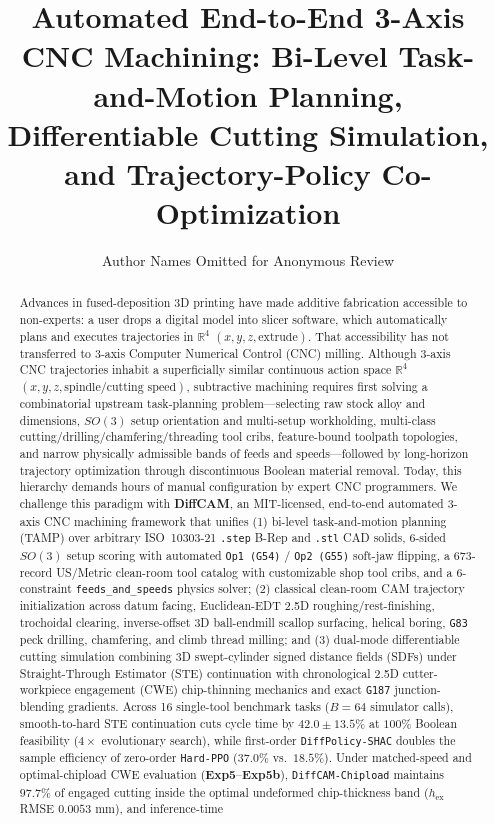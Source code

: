 \documentclass[conference]{IEEEtran}
\begin{document}
\title{Automated End-to-End 3-Axis CNC Machining: Bi-Level Task-and-Motion Planning, Differentiable Cutting Simulation, and Trajectory-Policy Co-Optimization}

\author{Author Names Omitted for Anonymous Review}

\maketitle

\begin{abstract}
Advances in fused-deposition 3D printing have made additive fabrication accessible to non-experts: a user drops a digital model into slicer software, which automatically plans and executes trajectories in $\mathbb{R}^4$ $(x, y, z, \text{extrude})$. That accessibility has not transferred to 3-axis Computer Numerical Control (CNC) milling. Although 3-axis CNC trajectories inhabit a superficially similar continuous action space $\mathbb{R}^4$ $(x, y, z, \text{spindle/cutting speed})$, subtractive machining requires first solving a combinatorial upstream task-planning problem—selecting raw stock alloy and dimensions, $SO(3)$ setup orientation and multi-setup workholding, multi-class cutting/drilling/chamfering/threading tool cribs, feature-bound toolpath topologies, and narrow physically admissible bands of feeds and speeds—followed by long-horizon trajectory optimization through discontinuous Boolean material removal. Today, this hierarchy demands hours of manual configuration by expert CNC programmers. We challenge this paradigm with \textbf{DiffCAM}, an MIT-licensed, end-to-end automated 3-axis CNC machining framework that unifies (1) bi-level task-and-motion planning (TAMP) over arbitrary ISO~10303-21 \texttt{.step} B-Rep and \texttt{.stl} CAD solids, 6-sided $SO(3)$ setup scoring with automated \texttt{Op1 (G54)} / \texttt{Op2 (G55)} soft-jaw flipping, a 673-record US/Metric clean-room tool catalog with customizable shop tool cribs, and a 6-constraint \texttt{feeds\_and\_speeds} physics solver; (2) classical clean-room CAM trajectory initialization across datum facing, Euclidean-EDT 2.5D roughing/rest-finishing, trochoidal clearing, inverse-offset 3D ball-endmill scallop surfacing, helical boring, \texttt{G83} peck drilling, chamfering, and climb thread milling; and (3) dual-mode differentiable cutting simulation combining 3D swept-cylinder signed distance fields (SDFs) under Straight-Through Estimator (STE) continuation with chronological 2.5D cutter-workpiece engagement (CWE) chip-thinning mechanics and exact \texttt{G187} junction-blending gradients. Across 16 single-tool benchmark tasks ($B = 64$ simulator calls), smooth-to-hard STE continuation cuts cycle time by $\mathbf{42.0 \pm 13.5\%}$ at $100\%$ Boolean feasibility ($4\times$ evolutionary search), while first-order \texttt{DiffPolicy-SHAC} doubles the sample efficiency of zero-order \texttt{Hard-PPO} ($\mathbf{37.0\%}$ vs.\ $\mathbf{18.5\%}$). Under matched-speed and optimal-chipload CWE evaluation (\textbf{Exp5}--\textbf{Exp5b}), \texttt{DiffCAM-Chipload} maintains $\mathbf{97.7\%}$ of engaged cutting inside the optimal undeformed chip-thickness band ($h_{\text{ex}}$ RMSE $0.0053\text{ mm}$), and inference-time 
\end{abstract}
\end{document}

